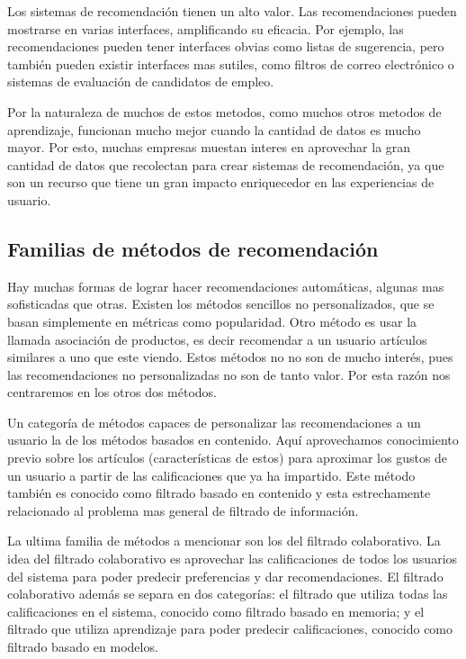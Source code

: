 \documentclass[11pt]{article}
\begin{document}
Los sistemas de recomendación tienen un alto valor. Las recomendaciones pueden
mostrarse en varias interfaces, amplificando su eficacia. Por ejemplo, las
recomendaciones pueden tener interfaces obvias como listas de sugerencia, pero
también pueden existir interfaces mas sutiles, como filtros de correo
electrónico o sistemas de evaluación de candidatos de empleo.

Por la naturaleza de muchos de estos metodos, como muchos otros metodos de
aprendizaje, funcionan mucho mejor cuando la cantidad de datos es mucho mayor.
Por esto, muchas empresas muestan interes en aprovechar la gran cantidad de
datos que recolectan para crear sistemas de recomendación, ya que son un recurso
que tiene un gran impacto enriquecedor en las experiencias de usuario.

\subsection{Familias de métodos de recomendación}

Hay muchas formas de lograr hacer recomendaciones automáticas, algunas mas
sofisticadas que otras. Existen los métodos sencillos no personalizados, que se
basan simplemente en métricas como popularidad. Otro método es usar la llamada
asociación de productos, es decir recomendar a un usuario artículos similares a
uno que este viendo. Estos métodos no no son de mucho interés, pues las
recomendaciones no personalizadas no son de tanto valor. Por esta razón nos
centraremos en los otros dos métodos.

Un categoría de métodos capaces de personalizar las recomendaciones a un usuario
la de los métodos basados en contenido. Aquí aprovechamos conocimiento previo
sobre los artículos (características de estos) para aproximar los gustos de un
usuario a partir de las calificaciones que ya ha impartido. Este método también
es conocido como filtrado basado en contenido y esta estrechamente relacionado
al problema mas general de filtrado de información.

La ultima familia de métodos a mencionar son los del filtrado colaborativo. La
idea del filtrado colaborativo es aprovechar las calificaciones de todos los
usuarios del sistema para poder predecir preferencias y dar recomendaciones. El
filtrado colaborativo además se separa en dos categorías: el filtrado que
utiliza todas las calificaciones en el sistema, conocido como filtrado basado en
memoria; y el filtrado que utiliza aprendizaje para poder predecir
calificaciones, conocido como filtrado basado en modelos.
\end{document}
